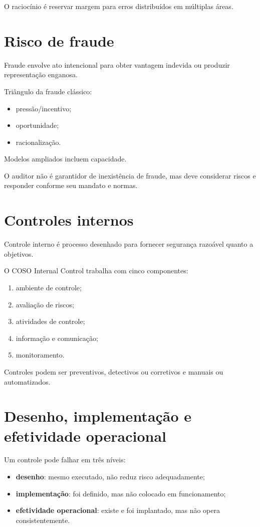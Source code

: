 O raciocínio é reservar margem para erros distribuídos em múltiplas áreas.

\section{Risco de fraude}

Fraude envolve ato intencional para obter vantagem indevida ou produzir representação enganosa.

Triângulo da fraude clássico:
\begin{itemize}
\item pressão/incentivo;
\item oportunidade;
\item racionalização.
\end{itemize}

Modelos ampliados incluem capacidade.

O auditor não é garantidor de inexistência de fraude, mas deve considerar riscos e responder conforme seu mandato e normas.

\section{Controles internos}

Controle interno é processo desenhado para fornecer segurança razoável quanto a objetivos.

O COSO Internal Control trabalha com cinco componentes:
\begin{enumerate}
\item ambiente de controle;
\item avaliação de riscos;
\item atividades de controle;
\item informação e comunicação;
\item monitoramento.
\end{enumerate}

Controles podem ser preventivos, detectivos ou corretivos e manuais ou automatizados.

\section{Desenho, implementação e efetividade operacional}

Um controle pode falhar em três níveis:
\begin{itemize}
\item \textbf{desenho}: mesmo executado, não reduz risco adequadamente;
\item \textbf{implementação}: foi definido, mas não colocado em funcionamento;
\item \textbf{efetividade operacional}: existe e foi implantado, mas não opera consistentemente.
\end{itemize}

